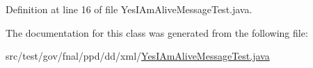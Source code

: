 Definition at line 16 of file Yes\-I\-Am\-Alive\-Message\-Test.\-java.



The documentation for this class was generated from the following file\-:\begin{DoxyCompactItemize}
\item 
src/test/gov/fnal/ppd/dd/xml/\hyperlink{YesIAmAliveMessageTest_8java}{Yes\-I\-Am\-Alive\-Message\-Test.\-java}\end{DoxyCompactItemize}
